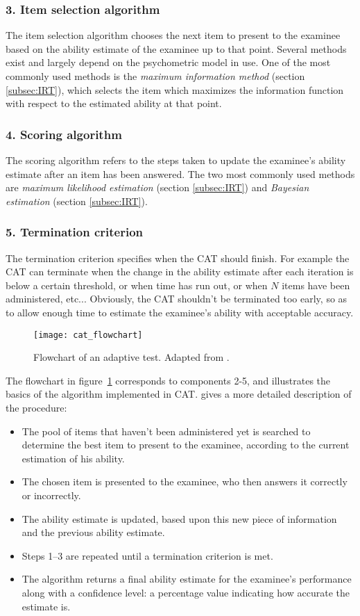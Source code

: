 \subsubsection{3. Item selection algorithm}
The item selection algorithm chooses the next item to present to the examinee based on the ability estimate of the examinee up to that point. Several methods exist and largely depend on the psychometric model in use. One of the most commonly used methods is the \textit{maximum information method} (section \ref{subsec:IRT}), which selects the item which maximizes the information function with respect to the estimated ability at that point.

\subsubsection{4. Scoring algorithm}
The scoring algorithm refers to the steps taken to update the examinee's ability estimate after an item has been answered. The two most commonly used methods are \textit{maximum likelihood estimation} (section \ref{subsec:IRT}) and \textit{Bayesian estimation} (section \ref{subsec:IRT}).

\subsubsection{5. Termination criterion}
The termination criterion specifies when the CAT should finish. For example the CAT can terminate when the change in the ability estimate after each iteration is below a certain threshold, or when time has run out, or when $N$ items have been administered, etc... Obviously, the CAT shouldn't be terminated too early, so as to allow enough time to estimate the examinee's ability with acceptable accuracy.

\begin{figure}[H]
\centering
\texttt{[image: cat\_flowchart]}
\caption{Flowchart of an adaptive test. Adapted from \cite{SIETTE}.}
\label{fig:cat_flowchart}
\end{figure}

The flowchart in figure~\ref{fig:cat_flowchart} corresponds to components 2-5, and illustrates the basics of the algorithm implemented in CAT. \cite{CAT-Wiki} gives a more detailed description of the procedure:
\begin{itemize}
\item[1.] The pool of items that haven't been administered yet is searched to determine the best item to present to the examinee, according to the current estimation of his ability.
\item[2.] The chosen item is presented to the examinee, who then answers it correctly or incorrectly.
\item[3.] The ability estimate is updated, based upon this new piece of information and the previous ability estimate.
\item[4.] Steps 1–3 are repeated until a termination criterion is met.
\item[5.] The algorithm returns a final ability estimate for the examinee's performance along with a confidence level: a percentage value indicating how accurate the estimate is.
\end{itemize}

